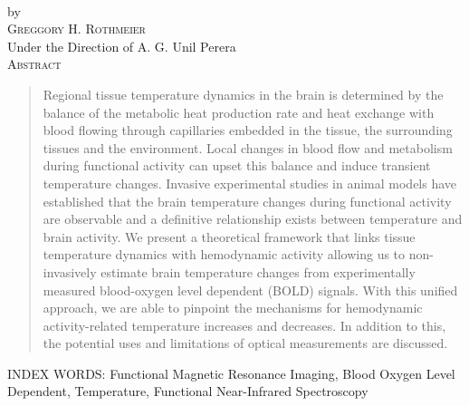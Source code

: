 \thispagestyle{empty}
\begin{center}
  \textsc{\thesisTitle } \\
  \vspace{0.2in}
  by \\
  \vspace{0.2in}
  \textsc{Greggory H. Rothmeier} \\
  \vspace{0.2in}
  Under the Direction of A. G. Unil Perera\\
  \vspace{0.2in}
  \textsc{Abstract}
  \vspace{0.2in}
\end{center}
  \begin{quote}
    Regional tissue temperature dynamics in the brain is determined by the balance of the metabolic heat production rate and heat exchange with blood flowing through capillaries embedded in the tissue, the surrounding tissues and the environment. Local changes in blood flow and metabolism during functional activity can upset this balance and induce transient temperature changes. Invasive experimental studies in animal models have established that the brain temperature changes during functional activity are observable and a definitive relationship exists between temperature and brain activity. We present a theoretical framework that links tissue temperature dynamics with hemodynamic activity allowing us to non-invasively estimate brain temperature changes from experimentally measured blood-oxygen level dependent (BOLD) signals. With this unified approach, we are able to pinpoint the mechanisms for hemodynamic activity-related temperature increases and decreases.  In addition to this, the potential uses and limitations of optical measurements are discussed.  
  \end{quote}
\vspace*{\fill}
INDEX WORDS: Functional Magnetic Resonance Imaging, Blood Oxygen Level Dependent, Temperature, Functional Near-Infrared Spectroscopy